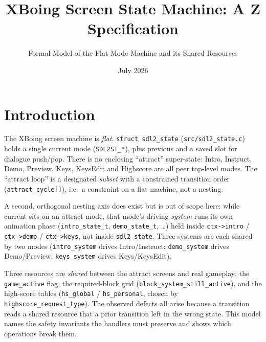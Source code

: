 \documentclass[a4paper,10pt,fleqn]{article}
\begin{document}
\title{XBoing Screen State Machine: A Z Specification}
\author{Formal Model of the Flat Mode Machine and its Shared Resources}
\date{July 2026}
\maketitle

\tableofcontents
\newpage

\section{Introduction}

The XBoing screen machine is \emph{flat}.  \texttt{struct sdl2\_state}
(\texttt{src/sdl2\_state.c}) holds a single \textsf{current} mode
(\texttt{SDL2ST\_*}), plus \textsf{previous} and a \textsf{saved} slot
for dialogue push/pop.  There is no enclosing ``attract'' super-state:
\textsf{Intro}, \textsf{Instruct}, \textsf{Demo}, \textsf{Preview},
\textsf{Keys}, \textsf{KeysEdit} and \textsf{Highscore} are all
peer top-level modes.  The ``attract loop'' is a designated
\emph{subset} with a constrained transition order (\texttt{attract\_cycle[]}),
i.e.\ a constraint on a flat machine, not a nesting.

A second, orthogonal nesting axis does exist but is out of scope here:
while \textsf{current} sits on an attract mode, that mode's driving
\emph{system} runs its own animation phase (\texttt{intro\_state\_t},
\texttt{demo\_state\_t}, \dots) held inside \texttt{ctx->intro} /
\texttt{ctx->demo} / \texttt{ctx->keys}, not inside \texttt{sdl2\_state}.
Three systems are each shared by two modes (\texttt{intro\_system}
  drives \textsf{Intro}/\textsf{Instruct}; \texttt{demo\_system} drives
  \textsf{Demo}/\textsf{Preview}; \texttt{keys\_system} drives
\textsf{Keys}/\textsf{KeysEdit}).

Three resources are \emph{shared} between the attract screens and real
gameplay: the \texttt{game\_active} flag, the required-block grid
(\texttt{block\_system\_still\_active}), and the high-score tables
(\texttt{hs\_global} / \texttt{hs\_personal}, chosen by
\texttt{highscore\_request\_type}).  The observed defects all arise
because a transition reads a shared resource that a prior transition
left in the wrong state.  This model names the safety invariants the
handlers must preserve and shows which operations break them.
\end{document}
